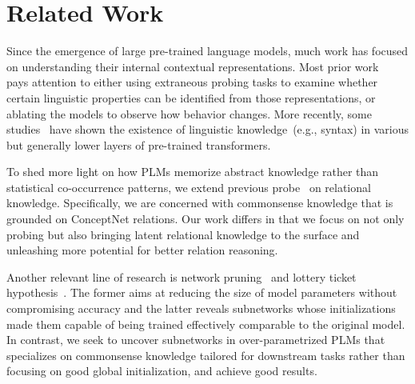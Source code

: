 \section{Related Work}
Since the emergence of large pre-trained language models, 
much work has focused on understanding their internal contextual representations. 
Most prior work~\cite{shi-etal-2016-string,belinkov-etal-2017-neural} 
pays attention to either using extraneous 
probing tasks to examine whether certain linguistic properties 
can be identified from those representations, or ablating the models 
to observe how behavior changes. More recently, some 
studies~\cite{DBLP:journals/corr/abs-1901-05287,DBLP:journals/corr/abs-1905-06316} have shown the existence 
of linguistic knowledge~(e.g., syntax) in various but 
generally lower layers of pre-trained transformers.

To shed more light on how PLMs 
memorize abstract knowledge rather than statistical co-occurrence 
patterns, we extend previous probe~\citep{Petroni2020} on relational 
knowledge. Specifically, we are concerned with commonsense knowledge 
that is grounded on ConceptNet relations. Our work differs in that 
we focus on not only probing but also bringing latent relational knowledge 
to the surface and unleashing more potential for better relation reasoning.

Another relevant line of research is network 
pruning~\cite{liu2018rethinking,Lin2020Dynamic} and lottery ticket 
hypothesis~\cite{conf/iclr/FrankleC19,Prasanna2020,Chen2020}. 
The former aims at reducing the size of model parameters without 
compromising accuracy and the latter reveals subnetworks whose 
initializations made them capable of being trained effectively comparable 
to the original model. In contrast, we seek to uncover subnetworks in 
over-parametrized PLMs that specializes on commonsense knowledge 
tailored for downstream tasks rather than focusing on good global
initialization, and achieve good results. 
